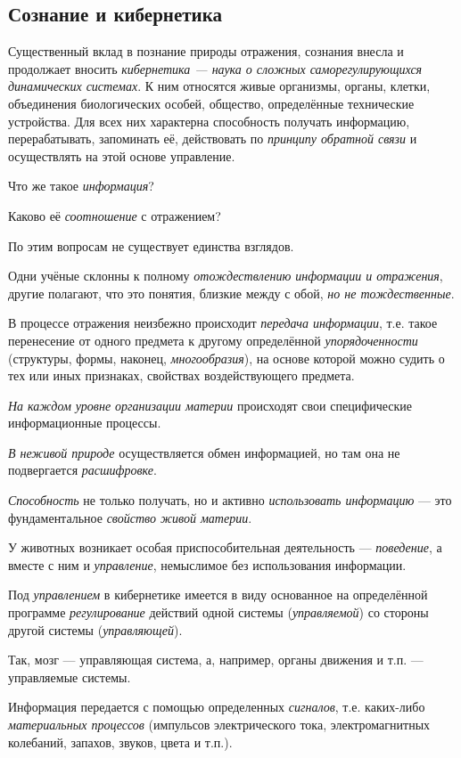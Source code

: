 \documentclass[a4paper,14pt,russian]{extreport}
\begin{document}
\subsection{Сознание и кибернетика}

Существенный вклад в познание природы отражения, сознания внесла и продолжает вносить \emph{кибернетика --- наука о сложных саморегулирующихся динамических системах}. К ним относятся живые организмы, органы, клетки, объединения биологических особей, общество, определённые технические устройства. Для всех них характерна способность получать информацию, перерабатывать, запоминать её, действовать по \emph{принципу обратной связи} и осуществлять на этой основе управление.

Что же такое \emph{информация}?

Каково её \emph{соотношение} с отражением?

По этим вопросам не существует единства взглядов.

Одни учёные склонны к полному \emph{отождествлению информации и отражения}, другие полагают, что это понятия, близкие между с обой, \emph{но не тождественные}.

В процессе отражения неизбежно происходит \emph{передача информации}, т.е. такое перенесение от одного предмета к другому определённой \emph{упорядоченности} (структуры, формы, наконец, \emph{многообразия}), на основе которой можно судить о тех или иных признаках, свойствах воздействующего предмета.

\emph{На каждом уровне организации материи} происходят свои специфические информационные процессы.

\emph{В неживой природе} осуществляется обмен информацией, но там она не подвергается \emph{расшифровке}.

\emph{Способность} не только получать, но и активно \emph{использовать информацию} --- это фундаментальное \emph{свойство живой материи}.

У животных возникает особая приспособительная деятельность --- \emph{поведение}, а вместе с ним и \emph{управление}, немыслимое без использования информации.

Под \emph{управлением} в кибернетике имеется в виду основанное на определённой программе \emph{регулирование} действий одной системы (\emph{управляемой}) со стороны другой системы (\emph{управляющей}).

Так, мозг --- управляющая система, а, например, органы движения и т.п. --- управляемые системы.

Информация передается с помощью определенных \emph{сигналов}, т.е. каких-либо \emph{материальных процессов} (импульсов электрического тока, электромагнитных колебаний, запахов, звуков, цвета и т.п.).
\end{document}
